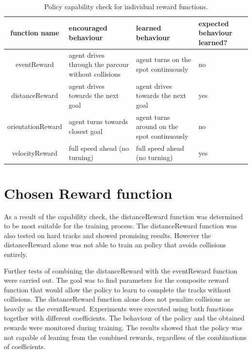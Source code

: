 \begin{table}
    \begin{center}
        \begin{tabular}{|| c | p{} | p{} | p{} ||}
            \hline
            function name     & encouraged behaviour                                & learned behaviour                           & expected behaviour learned? \\ [0.5ex]
            \hline\hline
            eventReward       & agent drives through the parcour without collisions & agent turns on the spot continuously        & no                          \\
            \hline
            distanceReward    & agent drives towards the next goal                  & agent drives towards the next goal          & yes                         \\
            \hline
            orientationReward & agent turns towards closest goal                    & agent turns around on the spot continuously & no                          \\
            \hline
            velocityReward    & full speed ahead (no turning)                       & full speed ahead (no turning)               & yes                         \\
            \hline
        \end{tabular}
    \end{center}
    \caption{Policy capability check for individual reward functions.}
    \label{table:reward_functions_behaviour}
\end{table}

\section{Chosen Reward function}

As a result of the capability check, the distanceReward function was determined to be most suitable for the training process. The distanceReward function was also tested on hard tracks and showed promising results. However the distanceReward alone was not able to train an policy that avoids collisions entirely.

Further tests of combining the distanceReward with the eventReward function were carried out. The goal was to find parameters for the composite reward function that would allow the policy to learn to complete the tracks without collisions. The distanceReward function alone does not penalize collisions as heavily as the eventReward.
Experiments were executed using both functions together with different coefficients. The behaviour of the policy and the obtained rewards were monitored during training. The results showed that the policy was not capable of leaning from the combined rewards, regardless of the combinations of coefficients.

